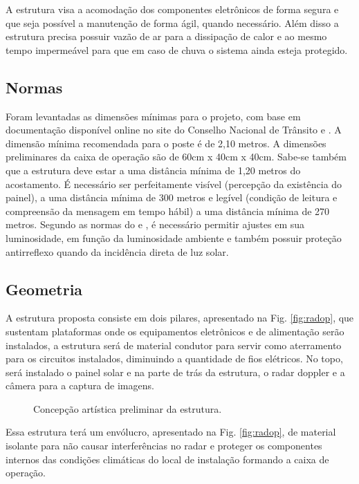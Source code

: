 A estrutura visa a acomodação dos componentes eletrônicos de forma segura e que seja possível a manutenção de forma ágil, quando necessário. Além disso a estrutura precisa possuir vazão de ar para a dissipação de calor e ao mesmo tempo impermeável para que em caso de chuva o sistema ainda esteja protegido.

\subsection{Normas}

Foram levantadas as dimensões mínimas para o projeto, com base em documentação disponível online no site do Conselho Nacional de Trânsito \cite{contranV} e \cite{contranVI}. A dimensão mínima recomendada para o poste é de 2,10 metros. A dimensões preliminares da caixa de operação são de 60cm x 40cm x 40cm. Sabe-se também que a estrutura deve estar a uma distância mínima de 1,20 metros do acostamento. É necessário ser perfeitamente visível (percepção da existência do painel), a uma distância mínima de 300 metros e legível (condição de leitura e compreensão da mensagem em tempo hábil) a uma distância mínima de 270 metros. Segundo as normas do \cite{contranV} e \cite{contranVI}, é necessário permitir ajustes em sua
luminosidade, em função da luminosidade ambiente e também possuir proteção antirreflexo quando da incidência direta de luz solar.

\subsection{Geometria}
A estrutura proposta consiste em dois pilares, apresentado na Fig. \ref{fig:radop}, que sustentam plataformas onde os equipamentos eletrônicos e de alimentação serão instalados, a estrutura será de material condutor para servir como aterramento para os circuitos instalados, diminuindo a quantidade de fios elétricos. No topo, será instalado o painel solar e na parte de trás da estrutura, o radar doppler e a câmera para a captura de imagens.   

\begin{figure}[h]
    \caption{\label{fig:estrutura} Concepção artística preliminar da estrutura.}
\end{figure}
\pagebreak
Essa estrutura terá um envólucro, apresentado na Fig. \ref{fig:radop}, de material isolante para não causar interferências no radar e proteger os componentes internos das condições climáticas do local de instalação formando a caixa de operação.


